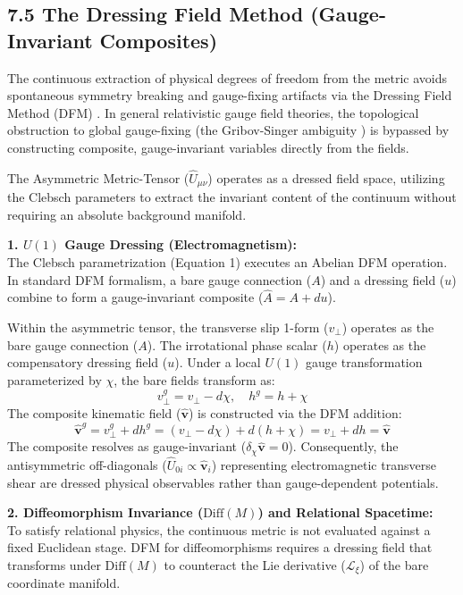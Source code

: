 \subsection*{7.5 The Dressing Field Method (Gauge-Invariant Composites)} 
\label{sec:dressing_field_method}

The continuous extraction of physical degrees of freedom from the metric avoids spontaneous symmetry breaking and gauge-fixing artifacts via the Dressing Field Method (DFM) \cite{Francois2024}. In general relativistic gauge field theories, the topological obstruction to global gauge-fixing (the Gribov-Singer ambiguity \cite{Gribov1978, Singer1978}) is bypassed by constructing composite, gauge-invariant variables directly from the fields.

The Asymmetric Metric-Tensor ($\hat{U}_{\mu\nu}$) operates as a dressed field space, utilizing the Clebsch parameters to extract the invariant content of the continuum without requiring an absolute background manifold. 

\textbf{1. $U(1)$ Gauge Dressing (Electromagnetism):} \\
The Clebsch parametrization (Equation 1) executes an Abelian DFM operation. 
In standard DFM formalism, a bare gauge connection ($A$) and a dressing field ($u$) combine to form a gauge-invariant composite ($\hat{A} = A + du$).



Within the asymmetric tensor, the transverse slip 1-form ($v_{\perp}$) operates as the bare gauge connection ($A$). The irrotational phase scalar ($h$) operates as the compensatory dressing field ($u$). Under a local $U(1)$ gauge transformation parameterized by $\chi$, the bare fields transform as: 
\begin{equation}
    v_{\perp}^g = v_{\perp} - d\chi, \quad h^g = h + \chi
\end{equation}
The composite kinematic field ($\mathbf{\hat{v}}$) is constructed via the DFM addition:
\begin{equation}
    \mathbf{\hat{v}}^g = v_{\perp}^g + d h^g = (v_{\perp} - d\chi) + d(h + \chi) = v_{\perp} + dh = \mathbf{\hat{v}}
\end{equation}
The composite resolves as gauge-invariant ($\delta_\chi \mathbf{\hat{v}} = 0$). 
Consequently, the antisymmetric off-diagonals ($\hat{U}_{0i} \propto \mathbf{\hat{v}}_i$) representing electromagnetic transverse shear are dressed physical observables rather than gauge-dependent potentials. 


\textbf{2. Diffeomorphism Invariance ($\text{Diff}(M)$) and Relational Spacetime:} \\
To satisfy relational physics, the continuous metric is not evaluated against a fixed Euclidean stage. DFM for diffeomorphisms requires a dressing field that transforms under $\text{Diff}(M)$ to counteract the Lie derivative ($\mathcal{L}_\xi$) of the bare coordinate manifold. 

